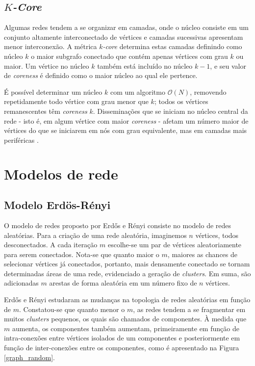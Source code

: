\subsection{\textit{$K$-Core}}

Algumas redes tendem a se organizar em camadas, onde o núcleo consiste em um conjunto altamente interconectado
de vértices e camadas sucessivas apresentam menor interconexão. A métrica \textit{$k$-core} determina estas 
camadas definindo como núcleo $k$ o maior subgrafo conectado que contém apenas vértices com grau $k$
ou maior. Um vértice no núcleo $k$ também está incluído no núcleo $k-1$, e seu valor de \textit{coreness}
é definido como o maior núcleo ao qual ele pertence.

É possível determinar um núcleo $k$ com um algoritmo $\mathcal{O}(N)$, removendo repetidamente todo vértice
com grau menor que $k$; todos os vértices remanescentes têm \textit{coreness} $k$. Disseminações que se 
iniciam no núcleo central da rede - isto é, em algum vértice com maior \textit{coreness} - afetam um número 
maior de vértices do que se iniciarem em nós com grau equivalente, mas em camadas mais periféricas 
\cite{stanley2010identification}.

\section{Modelos de rede}
\label{sec:modelos}

\subsection{Modelo Erdös-Rényi}

O modelo de redes proposto por Erdős e Rényi \cite{erd6s1960evolution} consiste no modelo de redes aleatórias. Para a criação de uma rede aleatória, imaginemos $n$ vértices, todos desconectados. A cada iteração $m$ escolhe-se um par de vértices aleatoriamente para serem conectados. Nota-se que quanto maior o $m$, maiores as chances de selecionar vértices já conectados, portanto, mais densamente conectado se tornam determinadas áreas de uma rede, evidenciado a geração de \textit{clusters}. Em suma, são adicionadas $m$ arestas de forma aleatória em um número fixo de $n$ vértices.   

Erdős e Rényi estudaram as mudanças na topologia de redes aleatórias em função de $m$. Constatou-se que quanto menor o $m$, as redes tendem a se fragmentar em muitos \textit{clusters} pequenos, os quais são chamados de componentes. À medida que $m$ aumenta, os componentes também aumentam, primeiramente em função de intra-conexões entre vértices isolados de um componentes e posteriormente em função de inter-conexões entre os componentes, como é apresentado na Figura \ref{graph_random}.

